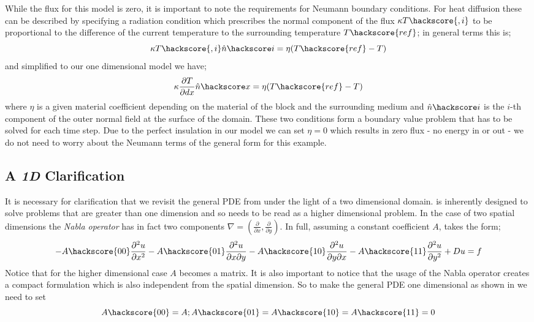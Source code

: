While the flux for this model is zero, it is important to note the requirements for Neumann boundary conditions. For heat diffusion these can be described by specifying a radiation condition which prescribes the normal component of the flux $\kappa T\hackscore{,i}$ to be proportional
to the difference of the current temperature to the surrounding temperature $T\hackscore{ref}$; in general terms this is;
\begin{equation}
 \kappa T\hackscore{,i} \hat{n}\hackscore i = \eta (T\hackscore{ref}-T) 
\label{eqn:hdbc}
\end{equation}
and simplified to our one dimensional model we have;
\begin{equation}
\kappa \frac{\partial T}{\partial dx} \hat{n}\hackscore x = \eta (T\hackscore{ref}-T) 
\end{equation}
where $\eta$ is a given material coefficient depending on the material of the block and the surrounding medium and $\hat{n}\hackscore i$ is the $i$-th component of the outer normal field  at the surface of the domain. These two conditions form a boundary value problem that has to be solved for each time step. Due to the perfect insulation in our model we can set $\eta = 0$ which results in zero flux - no energy in or out - we do not need to worry about the Neumann terms of the general form for this example.

\subsection{A \textit{1D} Clarification}
It is necessary for clarification that we revisit the general PDE from  under the light of a two dimensional domain. \esc is inherently designed to solve problems that are greater than one dimension and so  needs to be read as a higher dimensional problem. In the case of two spatial dimensions the \textit{Nabla operator} has in fact two components $\nabla = (\frac{\partial}{\partial x}, \frac{\partial}{\partial y})$. In full,  assuming a constant coefficient $A$, takes the form;
\begin{equation}\label{eqn:commonform2D}
-A\hackscore{00}\frac{\partial^{2}u}{\partial x^{2}} 
-A\hackscore{01}\frac{\partial^{2}u}{\partial x\partial y} 
-A\hackscore{10}\frac{\partial^{2}u}{\partial y\partial x} 
-A\hackscore{11}\frac{\partial^{2}u}{\partial y^{2}} 
+ Du = f
\end{equation}
Notice that for the higher dimensional case $A$ becomes a matrix. It is also
important to notice that the usage of the Nabla operator creates
a compact formulation which is also independent from the spatial dimension. 
So to make the general PDE  one dimensional as
shown in  we need to set
\begin{equation}
A\hackscore{00}=A; A\hackscore{01}=A\hackscore{10}=A\hackscore{11}=0
\end{equation}

